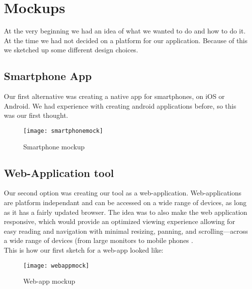 \section{Mockups}
At the very beginning we had an idea of what we wanted to do and how to do it. At the time we had not decided on a platform for our application. Because of this we sketched up some different design choices.

\subsection{Smartphone App}
Our first alternative was creating a native app for smartphones, on iOS or Android. We had experience with creating android applications before, so this was our first thought. 
\begin{figure}[h!]
\label{smartphonemock}
\centering
	\texttt{[image: smartphonemock]}
\caption{Smartphone mockup}
\end{figure}

\subsection{Web-Application tool}
Our second option was creating our tool as a web-application. Web-applications are platform independant and can be accessed on a wide range of devices, as long as it has a fairly updated browser. The idea was to also make the web application responsive, which would provide an optimized viewing experience allowing for easy reading and navigation with minimal resizing, panning, and scrolling—across a wide range of devices (from large monitors to mobile phones .\\
This is how our first sketch for a web-app looked like: 
\begin{figure}[h!]
\label{webappmock}
\centering 
	\texttt{[image: webappmock]}
\caption{Web-app mockup}
\end{figure}

